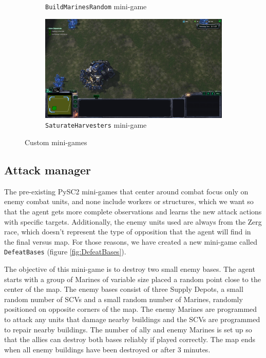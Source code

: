 \begin{figure}[t]
\begin{subfigure}[b]{0.45\textwidth}
        \caption{\texttt{BuildMarinesRandom} mini-game}
        \label{fig:BuildMarinesRandom}
    \end{subfigure}
    \hfill
    \begin{subfigure}[b]{0.45\textwidth}
        \includegraphics[width=1\textwidth]{figs/SaturateHarvesters.png}
        \caption{\texttt{SaturateHarvesters} mini-game}
        \label{fig:SaturateHarvesters}
    \end{subfigure}
    \caption{Custom mini-games}
\end{figure}

\subsection{Attack manager}

The pre-existing PySC2 mini-games that center around combat focus only on enemy combat units, and none include workers or structures, which we want so that the agent gets more complete observations and learns the new attack actions with specific targets. Additionally, the enemy units used are always from the Zerg race, which doesn't represent the type of opposition that the agent will find in the final versus map. For those reasons, we have created a new mini-game called \texttt{DefeatBases} (figure \ref{fig:DefeatBases}).

The objective of this mini-game is to destroy two small enemy bases. The agent starts with a group of Marines of variable size placed a random point close to the center of the map. The enemy bases consist of three Supply Depots, a small random number of SCVs and a small random number of Marines, randomly positioned on opposite corners of the map. The enemy Marines are programmed to attack any units that damage nearby buildings and the SCVs are programmed to repair nearby buildings. The number of ally and enemy Marines is set up so that the allies can destroy both bases reliably if played correctly. The map ends when all enemy buildings have been destroyed or after 3 minutes.

